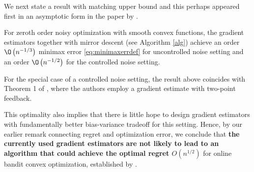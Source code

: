 We next state a result with matching upper bound and this perhaps appeared first in an asymptotic form in the paper by \citet{PoTsy90}.
\begin{theorem}
For zeroth order noisy optimization with smooth convex functions, the gradient estimators together with mirror descent (see Algorithm \ref{alg}) achieve
an order $\O\left( n^{-1/3}\right)$ minimax error \eqref{eq:minimaxerrdef} for uncontrolled noise setting and an order $\O\left( n^{-1/2}\right)$  for the controlled noise setting. 
\end{theorem}
For the special case of a controlled noise setting, the result above coincides with Theorem 1 of \cite{duchi2015optimal}, where the authors employ a gradient estimate with two-point feedback. 

This optimality also implies that there is little hope to design gradient estimators with fundamentally better bias-variance tradeoff for this setting. Hence, by our earlier remark connecting regret and optimization error, we conclude that
 \textbf{
the currently used gradient estimators are not likely to lead to an algorithm that could  achieve the optimal
regret $O(n^{1/2})$} for online bandit convex optimization, established by \citet{BubeckDKP15,BuEl15}.
\fi


